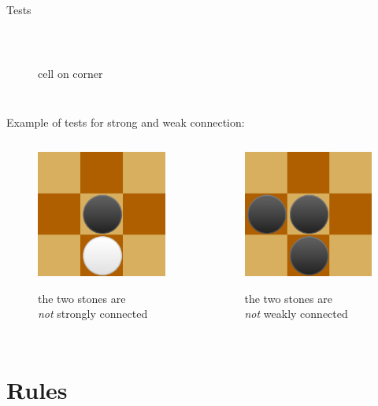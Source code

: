 \documentclass{beamer}
\begin{document}
\begin{frame}{Tests}
\begin{columns}
\begin{figure}
    \\cell on corner
\end{figure}
\end{columns}
	\vspace{0.9cm}
	Example of tests for strong and weak connection: 
	\begin{columns}
		\begin{figure}
			\includegraphics[scale=0.15]{images/test-strong-connection.png}
			
			the two stones are \\\textit{not} strongly connected
		\end{figure}
		
		\begin{figure}
			\includegraphics[scale=0.15]{images/test-weak-connection.png}
			
			the two stones are \\\textit{not} weakly connected
		\end{figure}
	\end{columns}
\end{frame}



\section{Rules}
\end{document}
